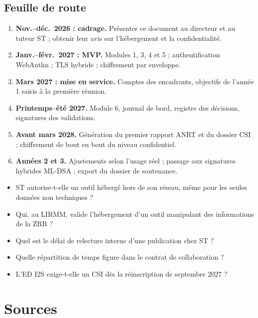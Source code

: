 \documentclass[11pt,a4paper]{article}
\begin{document}
\subsection{Feuille de route}
\begin{enumerate}
  \item \textbf{Nov.--déc.\ 2026 : cadrage.} Présenter ce document au directeur et au
  tuteur ST ; obtenir leur avis sur l'hébergement et la confidentialité.
  \item \textbf{Janv.--févr.\ 2027 : MVP.} Modules 1, 3, 4 et 5 ; authentification
  WebAuthn ; TLS hybride ; chiffrement par enveloppe.
  \item \textbf{Mars 2027 : mise en service.} Comptes des encadrants, objectifs de
  l'année 1 saisis à la première réunion.
  \item \textbf{Printemps--été 2027.} Module 6, journal de bord, registre des décisions,
  signatures des validations.
  \item \textbf{Avant mars 2028.} Génération du premier rapport ANRT et du dossier CSI ;
  chiffrement de bout en bout du niveau confidentiel.
  \item \textbf{Années 2 et 3.} Ajustements selon l'usage réel ; passage aux signatures
  hybrides ML-DSA ; export du dossier de soutenance.
\end{enumerate}

\begin{question}
\begin{itemize}[leftmargin=*]
  \item[$\square$] ST autorise-t-elle un outil hébergé hors de son réseau, même pour les
  seules données non techniques ?
  \item[$\square$] Qui, au LIRMM, valide l'hébergement d'un outil manipulant des
  informations de la ZRR ?
  \item[$\square$] Quel est le délai de relecture interne d'une publication chez ST ?
  \item[$\square$] Quelle répartition de temps figure dans le contrat de collaboration ?
  \item[$\square$] L'ED I2S exige-t-elle un CSI dès la réinscription de septembre 2027 ?
\end{itemize}
\end{question}

\section*{Sources}
\small
\end{document}
